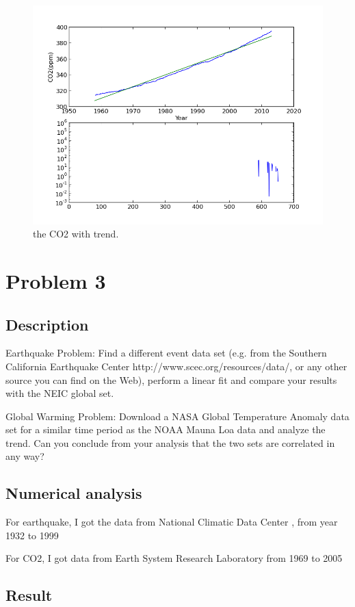 \documentclass[11pt,letterpaper]{article}
\begin{document}
\begin{figure}
\begin{center}
\includegraphics[width=0.6\linewidth,angle=0]{q2tre.png}
\caption{the CO2 with trend.}
\label{figure4}
\end{center}
\end{figure}






\newpage

\section{Problem 3}
\subsection{Description}
Earthquake Problem: Find a different event data set (e.g. from the Southern California Earthquake Center http://www.scec.org/resources/data/, or any other source you can find on the Web), perform a linear fit and compare your results with the NEIC global set.

Global Warming Problem: Download a NASA Global Temperature Anomaly data set for a similar time period as the NOAA Mauna Loa data and analyze the trend. Can you conclude from your analysis that the two sets are correlated in any way?
\subsection{Numerical analysis} 
For earthquake, I got the data from National Climatic Data Center \cite{NCDC}, from year 1932 to 1999

For CO2, I got data from Earth System Research Laboratory \cite{ESRL} from 1969 to 2005

\subsection{Result}
\end{document}
